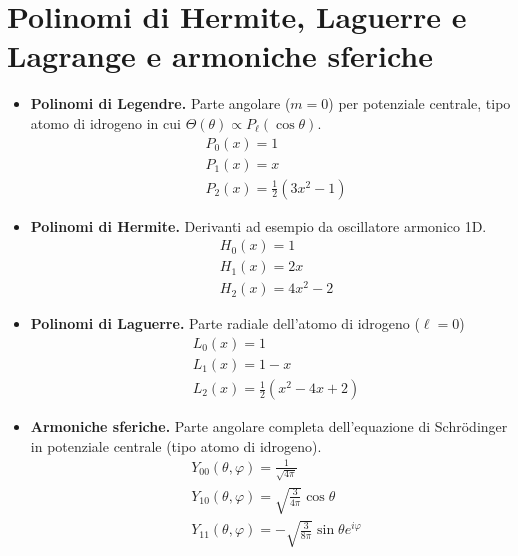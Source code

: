 \documentclass[11pt, a4paper]{scrartcl} %
\numberwithin{equation}{section}
\theoremstyle{style2}
\theoremstyle{style1}
\begin{document}
\section{Polinomi di Hermite, Laguerre e Lagrange e armoniche sferiche}
\begin{multicols}{2}
	\begin{itemize}
	\item {\sffamily \bfseries Polinomi di Legendre.} Parte angolare ($m=0$) per potenziale centrale, tipo atomo di idrogeno in cui $\Theta(\theta ) \propto P_\ell (\cos\theta )$.
		\begin{equation*}
\begin{split}
	& P_0(x) = 1\\
	& P_1(x) = x\\
	& P_2(x) = \frac{1}{2}(3x^2 -1)
\end{split}
		\end{equation*}
		\item {\sffamily \bfseries Polinomi di Hermite.} 
			Derivanti ad esempio da oscillatore armonico 1D.
			\begin{equation*}
				\begin{split}
					&H_0(x) = 1\\
					&H_1(x) = 2x\\
					& H_2(x) = 4x^2 -2
				\end{split}
			\end{equation*}
			\item {\sffamily \bfseries Polinomi di Laguerre.} Parte radiale dell'atomo di idrogeno ($\ell =0$)
				\begin{equation*}
\begin{split}
	&L_0(x) = 1 \\
	&L_1(x) = 1-x \\
	& L_2(x) = \frac{1}{2} (x^2 - 4x + 2)
\end{split}
				\end{equation*}
				\item {\sffamily \bfseries Armoniche sferiche.} 
					Parte angolare completa dell'equazione di Schr\"odinger in potenziale centrale (tipo atomo di idrogeno).
					\begin{equation*}
						\begin{split}
							&Y_{00} (\theta ,\varphi ) = \frac{1}{\sqrt{4\pi} }\\
							&Y_{10} (\theta ,\varphi ) = \sqrt{\frac{3}{4\pi}} \cos \theta \\
							& Y_{11} (\theta ,\varphi ) = - \sqrt{\frac{3}{8\pi}} \sin \theta e^{i\varphi } 
						\end{split}
					\end{equation*}
	\end{itemize}
\end{multicols}
\end{document}
